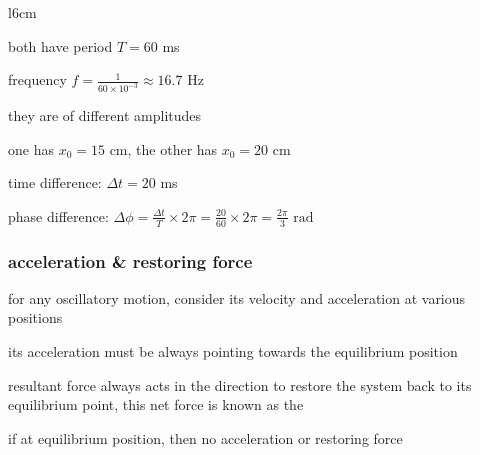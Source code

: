 
\begin{wrapfigure}{l}{6cm}
	\vspace*{-12pt}
		\centering
{}
\vspace*{-25pt}
\end{wrapfigure}

\sol both have period $T=60$ ms

frequency $f=\frac{1}{60\times10^{-3}} \approx 16.7$ Hz

they are of different amplitudes

one has $x_0=15$ cm, the other has $x_0=20$ cm

time difference: $\Delta t = 20$ ms

phase difference: $\Delta \phi = \frac{\Delta t}{T} \times 2\pi = \frac{20}{60} \times 2\pi = \frac{2\pi}{3} \text{ rad}$



\subsubsection{acceleration \& restoring force}
for any oscillatory motion, consider its velocity and acceleration at various positions

its acceleration must be always pointing towards the equilibrium position

resultant force always acts in the direction to restore the system back to its equilibrium point, this net force is known as the 

if at equilibrium position, then no acceleration or restoring force





